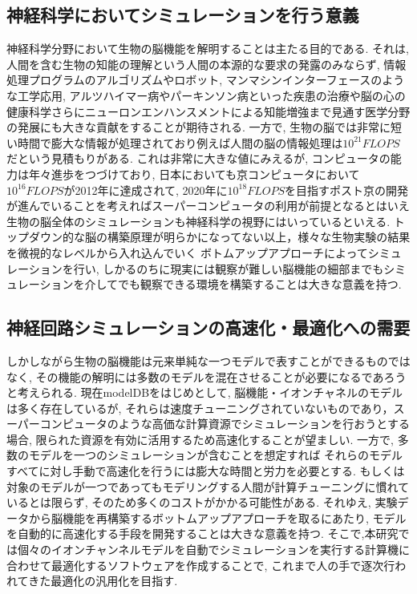 \subsection{神経科学においてシミュレーションを行う意義}
神経科学分野において生物の脳機能を解明することは主たる目的である.
それは, 人間を含む生物の知能の理解という人間の本源的な要求の発露のみならず,
情報処理プログラムのアルゴリズムやロボット, マンマシンインターフェースのような工学応用,
アルツハイマー病やパーキンソン病といった疾患の治療や脳の心の健康科学さらにニューロンエンハンスメントによる知能増強まで見通す医学分野の発展にも大きな貢献をすることが期待される.
一方で, 生物の脳では非常に短い時間で膨大な情報が処理されており例えば人間の脳の情報処理は$10^{21}FLOPS$だという見積もりがある\cite{science-roadmap}.
これは非常に大きな値にみえるが, コンピュータの能力は年々進歩をつづけており,
日本においても京コンピュータにおいて$10^{16}FLOPS$が2012年に達成されて,
2020年に$10^{18}FLOPS$を目指すポスト京の開発が進んでいることを考えればスーパーコンピュータの利用が前提となるとはいえ生物の脳全体のシミュレーションも神経科学の視野にはいっているといえる.
トップダウン的な脳の構築原理が明らかになってない以上，様々な生物実験の結果を微視的なレベルから入れ込んでいく ボトムアップアプローチによってシミュレーションを行い,
しかるのちに現実には観察が難しい脳機能の細部までもシミュレーションを介してでも観察できる環境を構築することは大きな意義を持つ.



\subsection{神経回路シミュレーションの高速化・最適化への需要}
しかしながら生物の脳機能は元来単純な一つモデルで表すことができるものではなく,
その機能の解明には多数のモデルを混在させることが必要になるであろうと考えられる.
現在modelDB\cite{model-db}をはじめとして, 脳機能・イオンチャネルのモデルは多く存在しているが,
それらは速度チューニングされていないものであり，スーパーコンピュータのような高価な計算資源でシミュレーションを行おうとする
場合, 限られた資源を有効に活用するため高速化することが望ましい.
一方で, 多数のモデルを一つのシミュレーションが含むことを想定すれば
それらのモデルすべてに対し手動で高速化を行うには膨大な時間と労力を必要とする.
もしくは対象のモデルが一つであってもモデリングする人間が計算チューニングに慣れているとは限らず,
そのため多くのコストがかかる可能性がある.
それゆえ, 実験データから脳機能を再構築するボットムアップアプローチを取るにあたり,
モデルを自動的に高速化する手段を開発することは大きな意義を持つ.
そこで,本研究では個々のイオンチャンネルモデルを自動でシミュレーションを実行する計算機に合わせて最適化するソフトウェアを作成することで,
これまで人の手で逐次行われてきた最適化の汎用化を目指す.
